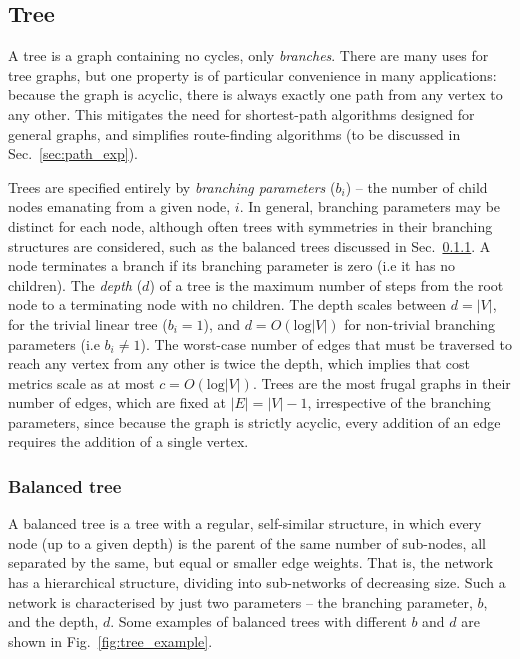 \documentclass[aps,rmp,twocolumn,amsmath,amssymb,nofootinbib,superscriptaddress,longbibliography,floatfix]{revtex4-1}
\begin{document}
%
%

\subsection{Tree} \label{sec:tree_graph}

A tree is a graph containing no cycles, only \emph{branches}. There are many uses for tree graphs, but one property is of particular convenience in many applications: because the graph is acyclic, there is always exactly one path from any vertex to any other. This mitigates the need for shortest-path algorithms designed for general graphs, and simplifies route-finding algorithms (to be discussed in Sec.~\ref{sec:path_exp}).

Trees are specified entirely by \emph{branching parameters} ($b_i$) -- the number of child nodes emanating from a given node, $i$. In general, branching parameters may be distinct for each node, although often trees with symmetries in their branching structures are considered, such as the balanced trees discussed in Sec.~\ref{sec:bal_tree}. A node terminates a branch if its branching parameter is zero (i.e it has no children). The \emph{depth} ($d$) of a tree is the maximum number of steps from the root node to a terminating node with no children. The depth scales between \mbox{$d=|V|$}, for the trivial linear tree (\mbox{$b_i=1$}), and \mbox{$d=O(\mathrm{log}|V|)$} for non-trivial branching parameters (i.e \mbox{$b_i\neq 1$}). The worst-case number of edges that must be traversed to reach any vertex from any other is twice the depth, which implies that cost metrics scale as at most \mbox{$c=O(\mathrm{log}|V|)$}. Trees are the most frugal graphs in their number of edges, which are fixed at \mbox{$|E|=|V|-1$}, irrespective of the branching parameters, since because the graph is strictly acyclic, every addition of an edge requires the addition of a single vertex.

%
%

\subsubsection{Balanced tree} \label{sec:bal_tree}

A balanced tree is a tree with a regular, self-similar structure, in which every node (up to a given depth) is the parent of the same number of sub-nodes, all separated by the same, but equal or smaller edge weights. That is, the network has a hierarchical structure, dividing into sub-networks of decreasing size. Such a network is characterised by just two parameters -- the branching parameter, $b$, and the depth, $d$. Some examples of balanced trees with different $b$ and $d$ are shown in Fig.~\ref{fig:tree_example}.
\end{document}
